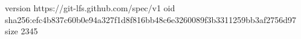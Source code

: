 version https://git-lfs.github.com/spec/v1
oid sha256:efc4b837c60b0e94a327f1d8f816bb48c6e3260089f3b3311259bb3af2756d97
size 2345
